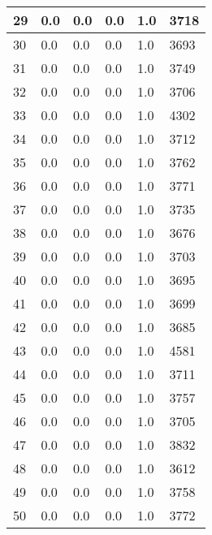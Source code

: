 \begin{longtable}{|l|l|l|l|l|l|}
29 & 0.0 & 0.0 & 0.0 & 1.0 & 3718 \\ \hline 
30 & 0.0 & 0.0 & 0.0 & 1.0 & 3693 \\ \hline 
31 & 0.0 & 0.0 & 0.0 & 1.0 & 3749 \\ \hline 
32 & 0.0 & 0.0 & 0.0 & 1.0 & 3706 \\ \hline 
33 & 0.0 & 0.0 & 0.0 & 1.0 & 4302 \\ \hline 
34 & 0.0 & 0.0 & 0.0 & 1.0 & 3712 \\ \hline 
35 & 0.0 & 0.0 & 0.0 & 1.0 & 3762 \\ \hline 
36 & 0.0 & 0.0 & 0.0 & 1.0 & 3771 \\ \hline 
37 & 0.0 & 0.0 & 0.0 & 1.0 & 3735 \\ \hline 
38 & 0.0 & 0.0 & 0.0 & 1.0 & 3676 \\ \hline 
39 & 0.0 & 0.0 & 0.0 & 1.0 & 3703 \\ \hline 
40 & 0.0 & 0.0 & 0.0 & 1.0 & 3695 \\ \hline 
41 & 0.0 & 0.0 & 0.0 & 1.0 & 3699 \\ \hline 
42 & 0.0 & 0.0 & 0.0 & 1.0 & 3685 \\ \hline 
43 & 0.0 & 0.0 & 0.0 & 1.0 & 4581 \\ \hline 
44 & 0.0 & 0.0 & 0.0 & 1.0 & 3711 \\ \hline 
45 & 0.0 & 0.0 & 0.0 & 1.0 & 3757 \\ \hline 
46 & 0.0 & 0.0 & 0.0 & 1.0 & 3705 \\ \hline 
47 & 0.0 & 0.0 & 0.0 & 1.0 & 3832 \\ \hline 
48 & 0.0 & 0.0 & 0.0 & 1.0 & 3612 \\ \hline 
49 & 0.0 & 0.0 & 0.0 & 1.0 & 3758 \\ \hline 
50 & 0.0 & 0.0 & 0.0 & 1.0 & 3772 \\ \hline 
\end{longtable}